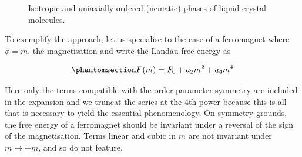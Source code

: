 \documentclass[
  letterpaper,
  enabledeprecatedfontcommands]{report}
\begin{document}
\begin{tcolorbox}
\begin{figure}[H]
\begin{minipage}{0.50\linewidth}
\end{minipage}%
%
\begin{minipage}{0.50\linewidth}



\end{minipage}%

\caption{\label{fig-mfsum}Isotropic and uniaxially ordered (nematic)
phases of liquid crystal molecules.}

\end{figure}%

\end{tcolorbox}

To exemplify the approach, let us specialise to the case of a
ferromagnet where \(\phi=m\), the magnetisation and write the Landau
free energy as

\begin{equation}\phantomsection\label{eq-landau}{
F(m)=F_0+a_2m^2+a_4m^4
}\end{equation}

Here only the terms compatible with the order parameter symmetry are
included in the expansion and we truncat the series at the 4th power
because this is all that is necessary to yield the essential
phenomenology. On symmetry grounds, the free energy of a ferromagnet
should be invariant under a reversal of the sign of the magnetisation.
Terms linear and cubic in \(m\) are not invariant under \(m\to -m\), and
so do not feature.
\end{document}
